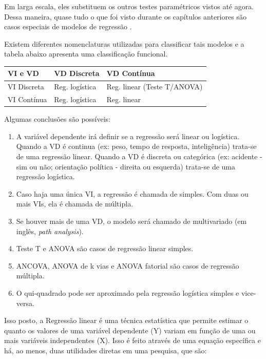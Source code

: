 \documentclass[
]{book}
\providecommand{\tightlist}{%
  \setlength{\itemsep}{0pt}\setlength{\parskip}{0pt}}
\begin{document}
Em larga escala, eles substituem os outros testes paramétricos vistos até agora. Dessa maneira, quase tudo o que foi visto durante os capítulos anteriores são casos especiais de modelos de regressão \citep{Chartier2008}.

Existem diferentes nomenclaturas utilizadas para classificar tais modelos e a tabela abaixo apresenta uma classificação funcional.

\begin{longtable}[]{@{}lll@{}}
\toprule
VI e VD & VD Discreta & VD Contínua\tabularnewline
\midrule
\endhead
VI Discreta & Reg. logística & Reg. linear (Teste T/ANOVA)\tabularnewline
VI Contínua & Reg. logística & Reg. linear\tabularnewline
\bottomrule
\end{longtable}

Algumas conclusões são possíveis:

\begin{enumerate}
\def\labelenumi{\arabic{enumi}.}
\tightlist
\item
  A variável dependente irá definir se a regressão será linear ou logística. Quando a VD é continua (ex: peso, tempo de resposta, inteligência) trata-se de uma regressão linear. Quando a VD é discreta ou categórica (ex: acidente - sim ou não; orientação política - direita ou esquerda) trata-se de uma regressão logística.\\
\item
  Caso haja uma única VI, a regressão é chamada de simples. Com duas ou mais VIs, ela é chamada de múltipla.\\
\item
  Se houver mais de uma VD, o modelo será chamado de multivariado (em inglês, \emph{path analysis}).\\
\item
  Teste T e ANOVA são casos de regressão linear simples.\\
\item
  ANCOVA, ANOVA de k vias e ANOVA fatorial são casos de regressão múltipla.\\
\item
  O qui-quadrado pode ser aproximado pela regressão logística simples e vice-versa.
\end{enumerate}

Isso posto, a Regressão linear é uma técnica estatística que permite estimar o quanto os valores de uma variável dependente (Y) variam em função de uma ou mais variáveis independentes (X). Isso é feito através de uma equação específica e há, ao menos, duas utilidades diretas em uma pesquisa, que são:
\end{document}
